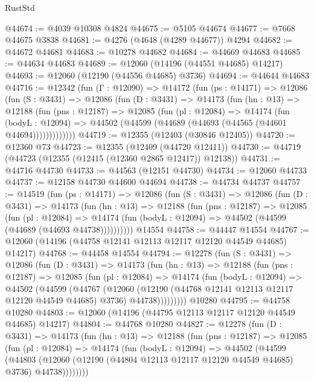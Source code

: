 \begin{lexlean}{RustStd}
\begin{coremodule}
@44674 := @4039 @10308 @4824
@44675 := @5105 @44674
@44677 := @7668 @44675 @3838
@44681 := @4276 (@4648 (@4289 @44677)) @4294
@44682 := @44672 @44681
@44683 := @10278 @44682
@44684 := @44669 @44683
@44685 := @44634 @44683
@44689 := @12060 (@14196 (@44551 @44685) @14217)
@44693 := @12060 (@12190 (@44556 @44685) @3736)
@44694 := @44644 @44683
@44716 := @12342
    (fun (Γ : @12090) =>
    @14172
      (fun (ps : @14171) =>
      @12086
        (fun (S : @3431) =>
        @12086
          (fun (D : @3431) =>
          @14173
            (fun (hn : @13) =>
            @12188
              (fun (pns : @12187) =>
              @12085
                (fun (pl : @12084) =>
                @14174
                  (fun (bodyL : @12094) =>
                  @44502 (@44599 (@44689 (@44693 (@44565 (@44601 @44694)))))))))))))
@44719 := @12355 (@12403 (@30846 @12405))
@44720 := @12360 @73
@44723 := @12355 (@12409 (@44720 @12411))
@44730 := @44719 (@44723 (@12355 (@12415 (@12360 @2865 @12417)) @12138))
@44731 := @44716 @44730
@44733 := @44563 (@12151 @44730)
@44734 := @12060 @44733
@44737 := @12158 @44730 @44600 @44694
@44738 := @44734 @44737
@44757 := @14519
    (fun (ps : @14171) =>
    @12086
      (fun (S : @3431) =>
      @12086
        (fun (D : @3431) =>
        @14173
          (fun (hn : @13) =>
          @12188
            (fun (pns : @12187) =>
            @12085
              (fun (pl : @12084) =>
              @14174 (fun (bodyL : @12094) => @44502 (@44599 (@44689 (@44693 @44738))))))))))
    @14554
@44758 := @44447 @14554
@44767 := @12060 (@14196 (@44758 @12141 @12113 @12117 @12120 @44549 @44685) @14217)
@44768 := @44458 @14554
@44794 := @12278
    (fun (S : @3431) =>
    @12086
      (fun (D : @3431) =>
      @14173
        (fun (hn : @13) =>
        @12188
          (fun (pns : @12187) =>
          @12085
            (fun (pl : @12084) =>
            @14174
              (fun (bodyL : @12094) =>
              @44502
                (@44599
                  (@44767
                    (@12060
                      (@12190 (@44768 @12141 @12113 @12117 @12120 @44549 @44685) @3736)
                      @44738)))))))))
    @10280
@44795 := @44758 @10280
@44803 := @12060 (@14196 (@44795 @12113 @12117 @12120 @44549 @44685) @14217)
@44804 := @44768 @10280
@44827 := @12278
    (fun (D : @3431) =>
    @14173
      (fun (hn : @13) =>
      @12188
        (fun (pns : @12187) =>
        @12085
          (fun (pl : @12084) =>
          @14174
            (fun (bodyL : @12094) =>
            @44502
              (@44599
                (@44803
                  (@12060 (@12190 (@44804 @12113 @12117 @12120 @44549 @44685) @3736) @44738))))))))

\end{coremodule}
\end{lexlean}
